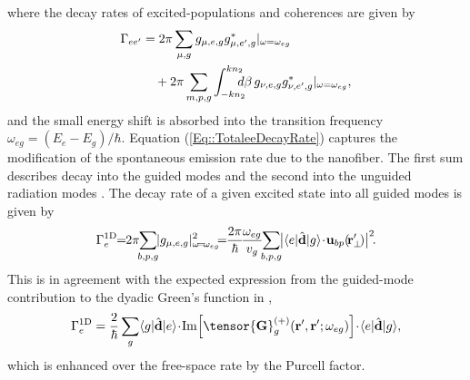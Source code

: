 \documentclass[aps,pra,twocolumn]{revtex4-1} %
\newcommand{\oneD}{{\rm 1D}}
\begin{document}
where the decay rates of excited-populations and coherences are given by 
	\begin{align}
		\Gamma_{ee'} &= 2\pi \sum_{\mu,g} g_{\mu,e,g}g^*_{\mu,e',g} \vert_{\omega=\omega_{eg}}\nonumber\\
		&\quad +2\pi 
\sum_{m,p,g} \int_{-kn_2}^{kn_2}\!\!\!\!\! d\beta \, g_{\nu,e,g}g^*_{\nu,e',g} \vert_{\omega=\omega_{eg}}, \label{Eq::TotaleeDecayRate}
	\end{align}
and the small energy shift is absorbed into the transition frequency $\omega_{eg} = (E_e - E_g)/\hbar$.  
Equation (\ref{Eq::TotaleeDecayRate}) captures the modification of the spontaneous emission rate due to the nanofiber.  
The first sum describes decay into the guided modes and the second into the unguided radiation modes \cite{ nha_cavity_1997,klimov_spontaneous_2004,le_kien_spontaneous_2005,maslov_distribution_2006, scheel_directional_2015}. The decay rate of a given excited state into all guided modes is given by
	\begin{equation}
		\Gamma_e^{\oneD}\!\!=\!\! 2\pi\!\! \sum_{b,p,g}\!\! |g_{\mu,e,g} |^2_{\omega \!=\! \omega_{eg}} \!\!\!=\!\!  \frac{ 2\pi }{\hbar}\! \frac{ \omega_{eg} }{v_g}\!\! \sum_{b,p,g}\!\! \big|\bra{e}\hat{\mathbf{d}}\ket{g} \!\cdot\! \mathbf{u}_{bp}(\!\br'_\perp\!)\big|^2 \! .
	\end{equation}
This is in agreement with the expected expression from the guided-mode contribution to the dyadic Green's function in ,
	\begin{equation} \label{Eq::Gamma1DGreens}
		\Gamma_e^{\oneD} =  \frac{2}{\hbar} \sum_{g}  \bra{g}\hat{\mathbf{d}}\ket{e}\!\cdot\! 
{\rm Im} \Big[\tensor{\mathbf{G}}^{(+)}_g(\br', \br'; \omega_{eg} ) \Big] \!\cdot\! \bra{e}\hat{\mathbf{d}}\ket{g},
	\end{equation}
which is enhanced over the free-space rate by the Purcell factor. 
\end{document}
